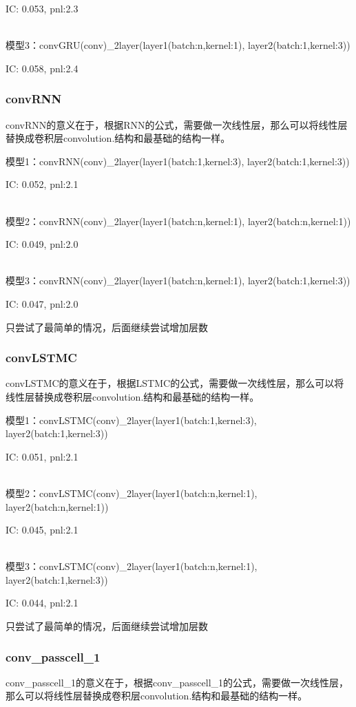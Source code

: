 \documentclass[11pt]{ctexart}
\begin{document}
{\kaishu \small IC: 0.053, pnl:2.3}

~\\
模型3：convGRU(conv)\_2layer(layer1(batch:n,kernel:1), layer2(batch:1,kernel:3))

{\kaishu \small IC: 0.058, pnl:2.4}


\subsubsection{convRNN}
convRNN的意义在于，根据RNN的公式，需要做一次线性层，那么可以将线性层替换成卷积层convolution.结构和最基础的结构一样。

模型1：convRNN(conv)\_2layer(layer1(batch:1,kernel:3), layer2(batch:1,kernel:3))

{\kaishu \small IC: 0.052, pnl:2.1}

~\\
模型2：convRNN(conv)\_2layer(layer1(batch:n,kernel:1), layer2(batch:n,kernel:1))

{\kaishu \small IC: 0.049, pnl:2.0}

~\\
模型3：convRNN(conv)\_2layer(layer1(batch:n,kernel:1), layer2(batch:1,kernel:3))

{\kaishu \small IC: 0.047, pnl:2.0}

只尝试了最简单的情况，后面继续尝试增加层数


\subsubsection{convLSTMC}
convLSTMC的意义在于，根据LSTMC的公式，需要做一次线性层，那么可以将线性层替换成卷积层convolution.结构和最基础的结构一样。

模型1：convLSTMC(conv)\_2layer(layer1(batch:1,kernel:3), layer2(batch:1,kernel:3))

{\kaishu \small IC: 0.051, pnl:2.1}

~\\
模型2：convLSTMC(conv)\_2layer(layer1(batch:n,kernel:1), layer2(batch:n,kernel:1))

{\kaishu \small IC: 0.045, pnl:2.1}

~\\
模型3：convLSTMC(conv)\_2layer(layer1(batch:n,kernel:1), layer2(batch:1,kernel:3))

{\kaishu \small IC: 0.044, pnl:2.1}

只尝试了最简单的情况，后面继续尝试增加层数


\subsubsection{conv\_passcell\_1}
conv\_passcell\_1的意义在于，根据conv\_passcell\_1的公式，需要做一次线性层，那么可以将线性层替换成卷积层convolution.结构和最基础的结构一样。
\end{document}
